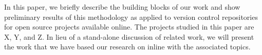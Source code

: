 In this paper, we briefly describe the building blocks of our work and show preliminary results
of this methodology as applied to version control repositories for open source projects available
online.  The projects studied in this paper are X, Y, and Z.  In lieu of a stand-alone discussion of
related work, we will present the work that we have based our research on inline with the associated
topics.